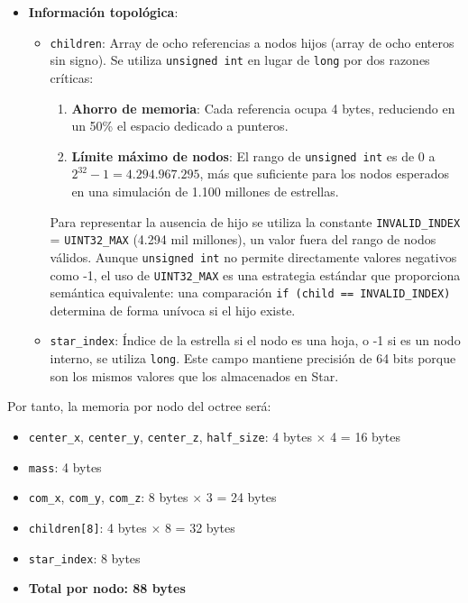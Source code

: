 \begin{itemize}
    \item \textbf{Información topológica}:
    \begin{itemize}
        \item \texttt{children}: Array de ocho referencias a nodos hijos (array de ocho enteros sin signo).
        Se utiliza \texttt{unsigned int} en lugar de \texttt{long} por dos razones críticas:
        \begin{enumerate}
            \item \textbf{Ahorro de memoria}: Cada referencia ocupa 4 bytes, reduciendo en un 50\% el espacio dedicado a punteros.

            \item \textbf{Límite máximo de nodos}: El rango de \texttt{unsigned int} es de 0 a $2^{32} - 1 = 4{.}294{.}967{.}295$, más que suficiente para los nodos esperados en una simulación de 1.100 millones de estrellas.
        \end{enumerate}

        Para representar la ausencia de hijo se utiliza la constante \texttt{INVALID\_INDEX} = \texttt{UINT32\_MAX} (4.294 mil millones), un valor fuera del rango de nodos válidos.
        Aunque \texttt{unsigned int} no permite directamente valores negativos como -1, el uso de \texttt{UINT32\_MAX} es una estrategia estándar que proporciona semántica equivalente: una comparación \texttt{if (child == INVALID\_INDEX)} determina de forma unívoca si el hijo existe.

        \item \texttt{star\_index}: Índice de la estrella si el nodo es una hoja, o -1 si es un nodo interno, se utiliza \texttt{long}.
        Este campo mantiene precisión de 64 bits porque son los mismos valores que los almacenados en Star.
    \end{itemize}
\end{itemize}

Por tanto, la memoria por nodo del octree será:
\begin{itemize}
    \item \texttt{center\_x}, \texttt{center\_y}, \texttt{center\_z}, \texttt{half\_size}: 4 bytes $\times$ 4 = 16 bytes
    \item \texttt{mass}: 4 bytes
    \item \texttt{com\_x}, \texttt{com\_y}, \texttt{com\_z}: 8 bytes $\times$ 3 = 24 bytes
    \item \texttt{children[8]}: 4 bytes $\times$ 8 = 32 bytes
    \item \texttt{star\_index}: 8 bytes
    \item \textbf{Total por nodo: 88 bytes}
\end{itemize}

